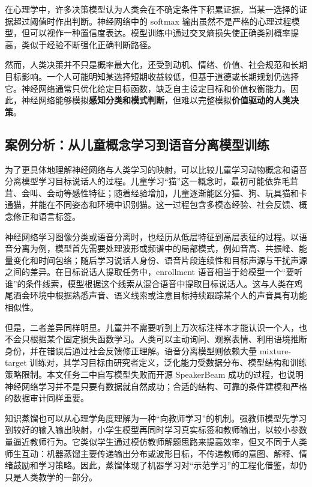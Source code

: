 \documentclass[UTF8,zihao=-4,a4paper]{ctexart}
\begin{document}
在心理学中，许多决策模型认为人类会在不确定条件下积累证据，当某一选择的证据超过阈值时作出判断。神经网络中的 softmax 输出虽然不是严格的心理过程模型，但可以视作一种置信度表达。模型训练中通过交叉熵损失使正确类别概率提高，类似于经验不断强化正确判断路径。

然而，人类决策并不只是概率最大化，还受到动机、情绪、价值、社会规范和长期目标影响。一个人可能明知某选择短期收益较低，但基于道德或长期规划仍选择它。神经网络通常只优化给定目标函数，缺乏自主设定目标和价值权衡能力。因此，神经网络能够模拟\textbf{感知分类和模式判断}，但难以完整模拟\textbf{价值驱动的人类决策}。

\subsection{案例分析：从儿童概念学习到语音分离模型训练}

为了更具体地理解神经网络与人类学习的映射，可以比较儿童学习动物概念和语音分离模型学习目标说话人的过程。儿童学习“猫”这一概念时，最初可能依靠毛茸茸、会叫、会动等感性特征；随着经验增加，儿童逐渐能区分猫、狗、玩具猫和卡通猫，并能在不同姿态和环境中识别猫。这一过程包含多模态经验、社会反馈、概念修正和语言标签。

神经网络学习图像分类或语音分离时，也经历从低层特征到高层表征的过程。以语音分离为例，模型首先需要处理波形或频谱中的局部模式，例如音高、共振峰、能量变化和时间包络；随后学习说话人身份、语音片段连续性和目标声源与干扰声源之间的差异。在目标说话人提取任务中，enrollment 语音相当于给模型一个“要听谁”的条件线索，模型根据这个线索从混合语音中提取目标说话人。这与人类在鸡尾酒会环境中根据熟悉声音、语义线索或注意目标持续跟踪某个人的声音具有功能相似性。

但是，二者差异同样明显。儿童并不需要听到上万次标注样本才能认识一个人，也不会只根据某个固定损失函数学习。人类可以主动询问、观察表情、利用语境推断身份，并在错误后通过社会反馈修正理解。语音分离模型则依赖大量 mixture-target 训练对，其学习目标由研究者定义，泛化能力受数据分布、模型结构和训练策略限制。本文任务二中自写模型失败而开源 SpeakerBeam 成功的过程，也说明神经网络学习并不是只要有数据就自然成功；合适的结构、可靠的条件建模和严格的数据审计同样重要。

知识蒸馏也可以从心理学角度理解为一种“向教师学习”的机制。强教师模型先学习到较好的输入输出映射，小学生模型再同时学习真实标签和教师输出，以较小参数量逼近教师行为。它类似学生通过模仿教师解题思路来提高效率，但又不同于人类师生互动：机器蒸馏主要传递输出分布或波形目标，不传递教师的意图、解释、情绪鼓励和学习策略。因此，蒸馏体现了机器学习对“示范学习”的工程化借鉴，却仍只是人类教学的一部分。
\end{document}
